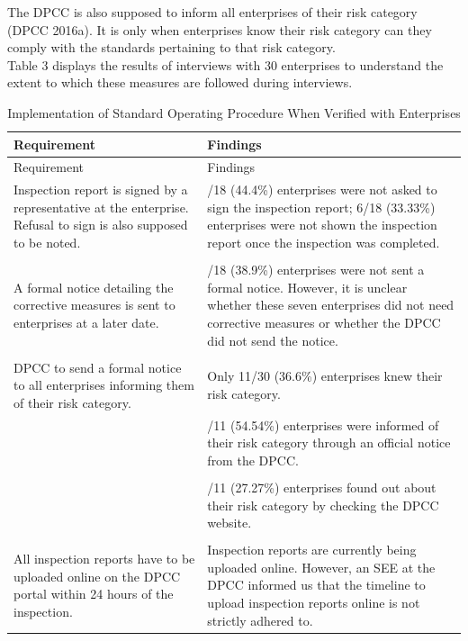 \documentclass[a4paper, 12pt]{article}
\begin{document}
	The DPCC is also supposed to inform all enterprises of their risk category (DPCC 2016a). It is only when enterprises know their risk category can they comply with the standards pertaining to that risk category. \\
	
	Table 3 displays the results of interviews with 30 enterprises to understand the extent to which these measures are followed during interviews.

	

\begin{longtable}{>{\raggedright}p{7.5cm}>{\raggedright\arraybackslash}p{7.5cm}}
\caption{Implementation of Standard Operating Procedure When Verified with Enterprises}\\
Requirement & Findings \\
\midrule
\endfirsthead
Requirement & Findings \\
\midrule
\endhead
\endfoot
\endlastfoot

Inspection report is signed by a representative at the enterprise. Refusal to sign is also supposed to be noted. & 8/18 (44.4\%) enterprises were not asked to sign the inspection report; 6/18 (33.33\%) enterprises were not shown the inspection report once the inspection was completed. \\
 & \\
A formal notice detailing the corrective measures is sent to enterprises at a later date. & 7/18 (38.9\%) enterprises were not sent a formal notice. However, it is unclear whether these seven enterprises did not need corrective measures or whether the DPCC did not send the notice. \\
 & \\
DPCC to send a formal notice to all enterprises informing them of their risk category. & Only 11/30 (36.6\%) enterprises knew their risk category. \\
 & 6/11 (54.54\%) enterprises were informed of their risk category through an official notice from the DPCC. \\
 & \\
& 3/11 (27.27\%) enterprises found out about their risk category by checking the DPCC website. \\
 & \\
All inspection reports have to be uploaded online on the DPCC portal within 24 hours of the inspection. & Inspection reports are currently being uploaded online. However, an SEE at the DPCC informed us that the timeline to upload inspection reports online is not strictly adhered to. \\

\end{longtable}
\end{document}
